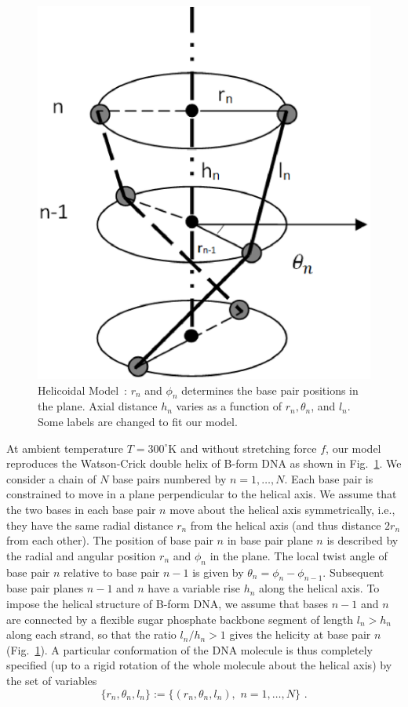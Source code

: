 \documentclass[12pt,masters,final]{UTRGVthesis}
\begin{document}
\indent
\begin{figure}[!h]
  \includegraphics[width=0.5 \textwidth]{DNA_helicoid.eps}
  \caption{\small Helicoidal Model~\protect\cite{cocco1999statistical}: $r_{n}$ and $\phi_{n}$ determines the base pair positions in the plane. Axial distance $h_{n}$ varies as a function of $r_{n},\theta_{n}$, and $l_{n}$. Some labels are changed to fit our model. }
  \label{fig:Helical Structure}
\end{figure}
At ambient  temperature $T = 300^\circ$K and without stretching force $f$,
our model reproduces the Watson-Crick double helix of B-form DNA as shown in Fig.~\ref{fig:Helical Structure}.
We consider a chain of $N$ base pairs numbered by $n = 1,\ldots,N$.
Each base pair is constrained to move in a plane perpendicular to the helical axis.
We assume that the two bases in each base pair $n$ move about the helical axis symmetrically, i.e., they
have the same radial distance $r_n$ from the helical axis (and thus distance $2 r_n$ from each other).
The position of base pair $n$ in 
base pair plane $n$ is described by the radial and angular position $r_n$ and $\phi_n$ in the plane.
The local twist angle of base pair $n$ relative to base pair $n-1$ is given by
$\theta_n = \phi_n - \phi_{n-1}$.
Subsequent base pair planes $n-1$ and $n$ have a variable rise $h_n$ along the helical axis.
To impose the helical structure of B-form DNA, we assume that bases $n-1$ and $n$ are connected
by a flexible sugar phosphate backbone segment of length $l_n > h_n$ along each strand, so that the
ratio $l_n / h_n > 1$ gives the helicity at base pair $n$ (Fig.~\ref{fig:Helical Structure}).
A particular conformation of the DNA molecule is thus completely specified
(up to a rigid rotation of the whole molecule about the helical axis) by the
set of variables
%
\begin{equation} \label{variables}
  \{r_n, \theta_n, l_n\} := \{(r_n, \theta_n, l_n), \, \, n = 1,\ldots,N\} \, \, .
\end{equation}
\end{document}
